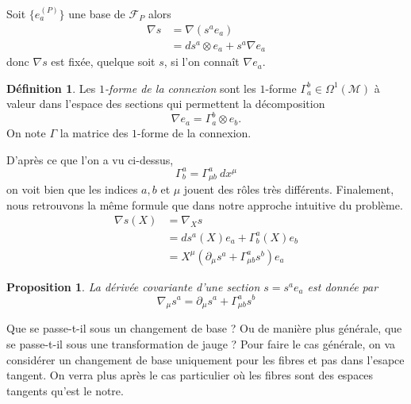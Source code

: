 \documentclass[a4paper,11pt]{report}
\theoremstyle{definition}
\theoremstyle{plain}
\newtheorem{prop}[thm]{Proposition}
\theoremstyle{definition}
\newtheorem{defn}{Définition}[chapter]
\theoremstyle{remark}
\newcommand{\M}{\mathscr{M}}
\newcommand{\F}{\mathcal{F}}
\newcommand{\p}{\partial}
\begin{document}
                Soit $\{e_a^{(P)}\}$ une base de $\F_P$ alors
                \begin{align}
                    \nabla s &= \nabla(s^a e_a)\\
                    &= ds^a\otimes e_a+s^a\nabla e_a
                \end{align}
            donc $\nabla s$ est fixée, quelque soit $s$, si l'on connaît $\nabla e_a$. 
            \begin{defn}
                Les \textit{$1$-forme de la connexion} sont les  $1$-forme $\Gamma^b_a\in\Omega^1(\M)$ à valeur dans l'espace des sections qui permettent la décomposition
                \begin{equation}
                    \nabla e_a = \Gamma^b_a \otimes e_b.
                \end{equation}
                On note $\Gamma$ la matrice des $1$-forme de la connexion.
             \end{defn}
             
            D'après ce que l'on a vu ci-dessus,
            \begin{equation}
                 \Gamma^a_b = \Gamma^a_{\mu b}~dx^\mu
            \end{equation}
            on voit bien que les indices $a,b$ et $\mu$ jouent des rôles très différents. Finalement, nous retrouvons la même formule que dans notre approche intuitive du problème.
            \begin{align}
                 \nabla s(X) &= \nabla_X s\\
                 &= ds^a(X)e_a+\Gamma^a_b(X)e_b\\
                 &= X^\mu(\p_\mu s^a+\Gamma^a_{\mu b}s^b)e_a
            \end{align}
             
            \begin{prop}
                    La dérivée covariante d'une section $s = s^a e_a$ est donnée par
                    \begin{equation}
                        \nabla_\mu s^a = \p_\mu s^a+\Gamma^a_{\mu b}s^b
                    \end{equation}
            \end{prop}
             
            Que se passe-t-il sous un changement de base ? Ou de manière plus générale, que se passe-t-il sous une transformation de jauge ? Pour faire le cas générale, on va considérer un changement de base uniquement pour les fibres et pas dans l'esapce tangent. On verra plus après le cas particulier où les fibres sont des espaces tangents qu'est le notre.
            
\end{document}
